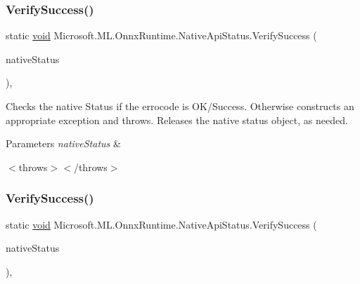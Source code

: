 \subsubsection{\texorpdfstring{Verify\+Success()}{VerifySuccess()}\hspace{0.1cm}{\footnotesize\ttfamily [1/2]}}
{\footnotesize\ttfamily static \mbox{\hyperlink{mlasi_8h_a88f941d423cb2a819b70a1358982b1a6}{void}} Microsoft.\+M\+L.\+Onnx\+Runtime.\+Native\+Api\+Status.\+Verify\+Success (\begin{DoxyParamCaption}\item[{Int\+Ptr}]{native\+Status }\end{DoxyParamCaption})\hspace{0.3cm}{\ttfamily [inline]}, {\ttfamily [static]}}



Checks the native Status if the errocode is O\+K/\+Success. Otherwise constructs an appropriate exception and throws. Releases the native status object, as needed. 


\begin{DoxyParams}{Parameters}
{\em native\+Status} & \\
\hline
\end{DoxyParams}
$<$throws$>$$<$/throws$>$ \mbox{\label{classMicrosoft_1_1ML_1_1OnnxRuntime_1_1NativeApiStatus_a1580510459f2d13ca056631528e28159}} 
\subsubsection{\texorpdfstring{Verify\+Success()}{VerifySuccess()}\hspace{0.1cm}{\footnotesize\ttfamily [2/2]}}
{\footnotesize\ttfamily static \mbox{\hyperlink{mlasi_8h_a88f941d423cb2a819b70a1358982b1a6}{void}} Microsoft.\+M\+L.\+Onnx\+Runtime.\+Native\+Api\+Status.\+Verify\+Success (\begin{DoxyParamCaption}\item[{Int\+Ptr}]{native\+Status }\end{DoxyParamCaption})\hspace{0.3cm}{\ttfamily [inline]}, {\ttfamily [static]}}



